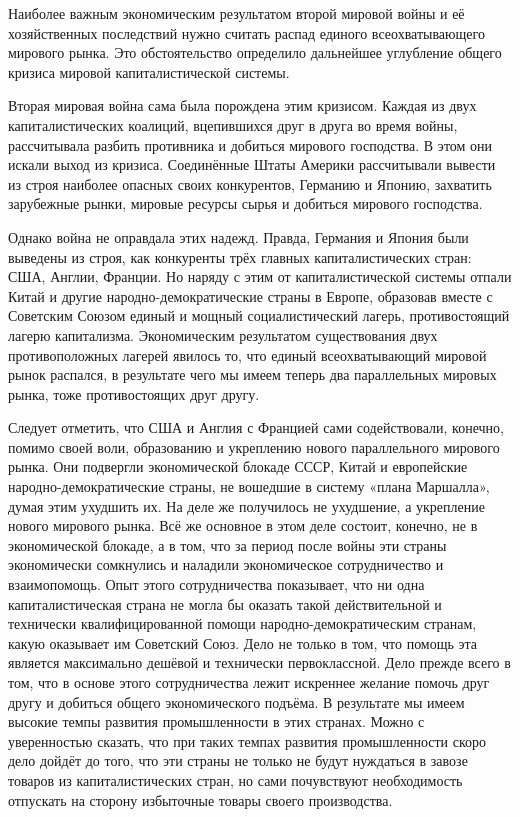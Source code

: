 \documentclass[12pt, a4paper, openany]{book}
\begin{document}
Наиболее важным экономическим результатом второй мировой войны и её хозяйственных последствий нужно считать распад единого всеохватывающего мирового рынка. Это обстоятельство определило дальнейшее углубление общего кризиса мировой капиталистической системы.



Вторая мировая война сама была порождена этим кризисом. Каждая из двух капиталистических коалиций, вцепившихся друг в друга во время войны, рассчитывала разбить противника и добиться мирового господства. В этом они искали выход из кризиса. Соединённые Штаты Америки рассчитывали вывести из строя наиболее опасных своих конкурентов, Германию и Японию, захватить зарубежные рынки, мировые ресурсы сырья и добиться мирового господства.



Однако война не оправдала этих надежд. Правда, Германия и Япония были выведены из строя, как конкуренты трёх главных капиталистических стран: США, Англии, Франции. Но наряду с этим от капиталистической системы отпали Китай и другие народно-демократические страны в Европе, образовав вместе с Советским Союзом единый и мощный социалистический лагерь, противостоящий лагерю капитализма. Экономическим результатом существования двух противоположных лагерей явилось то, что единый всеохватывающий мировой рынок распался, в результате чего мы имеем теперь два параллельных мировых рынка, тоже противостоящих друг другу.



Следует отметить, что США и Англия с Францией сами содействовали, конечно, помимо своей воли, образованию и укреплению нового параллельного мирового рынка. Они подвергли экономической блокаде СССР, Китай и европейские народно-демократические страны, не вошедшие в систему «плана Маршалла», думая этим ухудшить их. На деле же получилось не ухудшение, а укрепление нового мирового рынка. Всё же основное в этом деле состоит, конечно, не в экономической блокаде, а в том, что за период после войны эти страны экономически сомкнулись и наладили экономическое сотрудничество и взаимопомощь. Опыт этого сотрудничества показывает, что ни одна капиталистическая страна не могла бы оказать такой действительной и технически квалифицированной помощи народно-демократическим странам, какую оказывает им Советский Союз. Дело не только в том, что помощь эта является максимально дешёвой и технически первоклассной. Дело прежде всего в том, что в основе этого сотрудничества лежит искреннее желание помочь друг другу и добиться общего экономического подъёма. В результате мы имеем высокие темпы развития промышленности в этих странах. Можно с уверенностью сказать, что при таких темпах развития промышленности скоро дело дойдёт до того, что эти страны не только не будут нуждаться в завозе товаров из капиталистических стран, но сами почувствуют необходимость отпускать на сторону избыточные товары своего производства.
\end{document}
